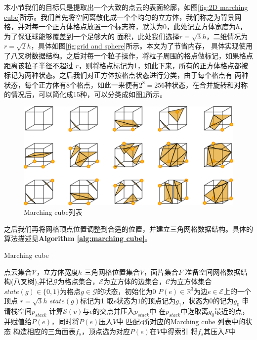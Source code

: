 本小节我们的目标只是提取出一个大致的点云的表面轮廓，如图\ref{fig:2D marching cube}所示。我们首先将空间离散化成一个个均匀的立方体，我们称之为背景网格，并对每一个正方体格点放置一个标志符，默认为0，此处记立方体宽度为$h$，为了保证球能够覆盖到一个足够大的
面积，此处我们选择$r = \sqrt{3}h$，二维情况为$r = \sqrt{2}h$，具体如图\ref{fig:grid and sphere}所示。本文为了节省内存，
具体实现使用了八叉树数据结构。之后对每一个粒子操作，将粒子周围的格点做标记，如果格点距离该粒子半径不超过
$r$，则将格点标记为1，如此下来，所有的正方体格点都被标记为两种状态。之后我们对正方体按格点状态进行分类，由于每个格点有
两种状态，每个正方体有8个格点，如此一来便有$2^8 = 256$种状态，在合并旋转和对称的情况后，可以简化成15种，可以分类成如图\ref{fig:marching cube table}所示。
\begin{figure}[htbp]
    \centering
    \includegraphics[scale=0.6]{./images/image6.png}
    \caption{Marching cube列表}
    \label{fig:marching cube table}
\end{figure}
之后我们再将网格顶点位置调整到合适的位置，并建立三角网格数据结构。具体的算法描述见\textbf{Algorithm \ref{alg:marching cube}}。
\begin{algorithm}
    \caption{Marching cube}
    \label{alg:marching cube}
    \begin{algorithmic}[1]
    \Require 点云集合$\mathcal{V}$，立方体宽度$h$
    \Ensure 三角网格位置集合$V$，面片集合$F$
    \State 准备空间网格数据结构(八叉树),并记$\mathcal{G}$为格点集合，$\mathcal{E}$为立方体的边集合，$\mathcal{C}$为立方体集合
    \State $state(g)\in \{0,1\}$为格点$g\in \mathcal{G}$的状态，初始化为0
    \State $P(e)\in \mathbb{R}^3$为边$e\in \mathcal{E}$上的一个顶点
    \State $r = \sqrt{3}h$
            \State $state(g)$标记为1    
        \EndFor
    \EndFor    
      \State  取$e$状态为$1$的顶点记为$g_1$，状态为$0$的记为$g_0$
      \State 申请栈空间$p_{stack}$
        \State 计算$\mathcal{S}(v)$与$e$的交点并压入$p_{stack}$中
      \EndFor
      \State 在$p_{stack}$中选取离$g_0$最近的点，并赋值给$P(e)$，同时将$P(e)$压入$V$中
    \EndFor
        \State 匹配$c$所对应的Marching cube 列表中的状态
        \State 构造相应的三角面表$f_s$，顶点选为对应$P(e)$在$V$中得索引
        \State 将$f_s$其压入$F$中
    \EndFor
    \end{algorithmic}
\end{algorithm}


